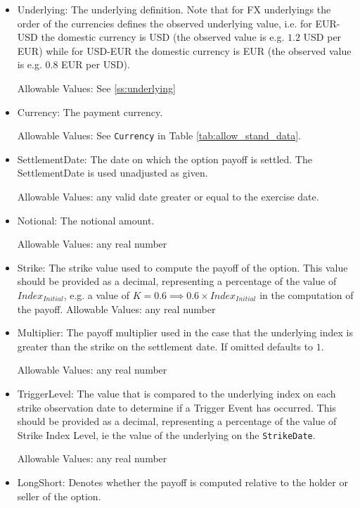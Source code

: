 \begin{itemize}
\item Underlying: The underlying definition. Note that for FX underlyings the order of the currencies defines the
  observed underlying value, i.e. for EUR-USD the domestic currency is USD (the observed value is e.g. $1.2$ USD per
  EUR) while for USD-EUR the domestic currency is EUR (the observed value is e.g. $0.8$ EUR per USD).

  Allowable Values: See \ref{ss:underlying}

\item Currency: The payment currency.

  Allowable Values: See \lstinline!Currency!  in Table \ref{tab:allow_stand_data}.

\item SettlementDate: The date on which the option payoff is settled. The SettlementDate is used unadjusted
  as given. 

  Allowable Values: any valid date greater or equal to the exercise date.

\item Notional: The notional amount. 

  Allowable Values: any real number

\item Strike: The strike value used to compute the payoff of the option. This value should be provided as a decimal, representing a percentage of the value of $Index_{Initial}$, e.g. a value of $K = 0.6 \implies 0.6 \times Index_{Initial}$ in the computation of the payoff. 
  Allowable Values: any real number

\item Multiplier: The payoff multiplier used in the case that the underlying index is greater than the strike on the settlement date. If omitted defaults to $1$.

  Allowable Values: any real number

\item TriggerLevel: The value that is compared to the underlying index on each strike observation date to determine if a Trigger Event has occurred. This should be provided as a decimal, representing a percentage of the value of Strike Index Level, ie the value of the underlying on the \lstinline!StrikeDate!.

  Allowable Values: any real number

\item LongShort: Denotes whether the payoff is computed relative to the holder or seller of the option.  


\end{itemize}
